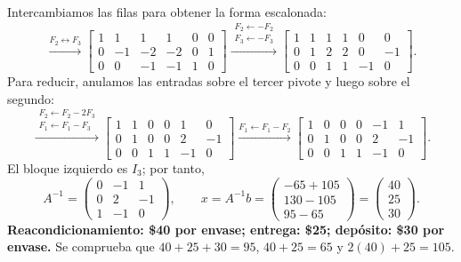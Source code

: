 \documentclass[10pt,a4]{examenEPN0}
\begin{document}
Intercambiamos las filas para obtener la forma escalonada:
\[
    \xrightarrow{F_2\leftrightarrow F_3}
    \left[\begin{array}{ccc|ccc}
        1&1&1&1&0&0\\0&-1&-2&-2&0&1\\0&0&-1&-1&1&0
    \end{array}\right]
    \xrightarrow{\substack{F_2\leftarrow-F_2\\F_3\leftarrow-F_3}}
    \left[\begin{array}{ccc|ccc}
        1&1&1&1&0&0\\0&1&2&2&0&-1\\0&0&1&1&-1&0
    \end{array}\right].
\]
Para reducir, anulamos las entradas sobre el tercer pivote y luego sobre el segundo:
\[
    \xrightarrow{\substack{F_2\leftarrow F_2-2F_3\\F_1\leftarrow F_1-F_3}}
    \left[\begin{array}{ccc|ccc}
        1&1&0&0&1&0\\0&1&0&0&2&-1\\0&0&1&1&-1&0
    \end{array}\right]
    \xrightarrow{F_1\leftarrow F_1-F_2}
    \left[\begin{array}{ccc|ccc}
        1&0&0&0&-1&1\\0&1&0&0&2&-1\\0&0&1&1&-1&0
    \end{array}\right].
\]
El bloque izquierdo es $I_3$; por tanto,
\[
    A^{-1}=\begin{pmatrix}0&-1&1\\0&2&-1\\1&-1&0\end{pmatrix},\qquad
    x=A^{-1}b=\begin{pmatrix}-65+105\\130-105\\95-65\end{pmatrix}
    =\begin{pmatrix}40\\25\\30\end{pmatrix}.
\]
\textbf{Reacondicionamiento: \$40 por envase; entrega: \$25; depósito: \$30 por envase.}
Se comprueba que $40+25+30=95$, $40+25=65$ y $2(40)+25=105$.
\end{document}
